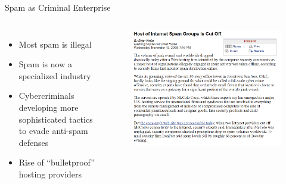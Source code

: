 \documentclass[nobackground,dvipsnames,table]{beamer}
\begin{document}
\begin{frame}{Spam as Criminal Enterprise}
    \begin{columns}
            \begin{itemize}
                \item Most spam is illegal
                \item Spam is now a specialized industry
                \item Cybercriminals developing more sophisticated tactics to evade anti-spam defenses
                \item Rise of “bulletproof” hosting providers
            \end{itemize}
            \begin{figure}
                \centering
                \includegraphics[width=\textwidth]{spam-groups-cut-off}
            \end{figure}
    \end{columns}
\end{frame}
\end{document}
